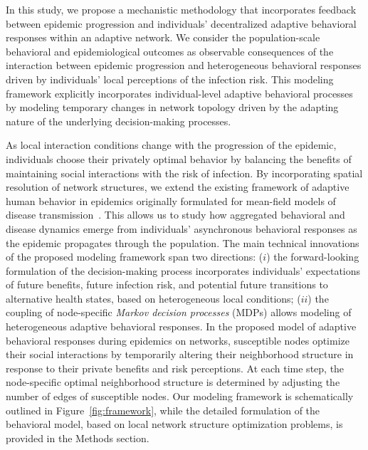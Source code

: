 \documentclass[9pt,twocolumn,twoside]{pnas-new}
\begin{document}

In this study, we propose a mechanistic methodology that incorporates feedback between epidemic progression and individuals' decentralized adaptive behavioral responses within an adaptive network.
%
We consider the population-scale behavioral and epidemiological outcomes as observable consequences of the interaction between epidemic progression and heterogeneous behavioral responses driven by individuals' local perceptions of the infection risk.
%
This modeling framework explicitly incorporates individual-level adaptive behavioral processes by modeling temporary changes in network topology driven by the adapting nature of the underlying decision-making processes.

As local interaction conditions change with the progression of the epidemic, individuals choose their privately optimal behavior by balancing the benefits of maintaining social interactions with the risk of infection.
%
%
By incorporating spatial resolution of network structures, we extend the existing framework of adaptive human behavior in epidemics originally formulated for mean-field models of disease transmission~\cite{fenichel2011adaptive, perrings2014merging, morin2013sir, espinoza2021adaptive, espinoza2022heterogeneous,espinoza2024adaptive,espinoza2025impact}. This allows us to study how aggregated behavioral and disease dynamics emerge from individuals' asynchronous behavioral responses as the epidemic propagates through the population.
%
The main technical innovations of the proposed modeling framework span two directions:
($i$) the forward-looking formulation of the decision-making process incorporates individuals' expectations of future benefits, future infection risk, and potential future transitions to alternative health states, based on heterogeneous local conditions;
($ii$) the coupling of node-specific {\em Markov decision processes} (MDPs) allows modeling of heterogeneous adaptive behavioral responses.
%
In the proposed model of adaptive behavioral responses during epidemics on networks, susceptible nodes optimize their social interactions by temporarily altering their neighborhood structure in response to their private benefits and risk perceptions. At each time step, the node-specific optimal neighborhood structure is determined by adjusting the number of edges of susceptible nodes.
%
Our modeling framework is schematically outlined in Figure~\ref{fig:framework}, while the detailed formulation of the behavioral model, based on local network structure optimization problems, is provided in the Methods section.
\end{document}
